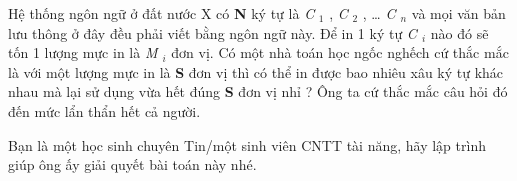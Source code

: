Hệ thống ngôn ngữ ở đất nước X có   \textbf{    N   }   ký tự là   \emph{    C   }$_    1   $   ,   \emph{    C   }$_    2   $   , …   \emph{    C    $_     n    $}   và mọi văn bản lưu thông ở đây đều phải viết bằng ngôn ngữ này. Để in 1 ký tự   \emph{    C    $_     i    $}   nào đó sẽ tốn 1 lượng mực in là   \emph{    M    $_     i    $}   đơn vị. Có một nhà toán học ngốc nghếch cứ thắc mắc là với một lượng mực in là   \textbf{    S   }   đơn vị thì có thể in được bao nhiêu xâu ký tự khác nhau mà lại sử dụng vừa hết đúng   \textbf{    S   }   đơn vị nhỉ ? Ông ta cứ thắc mắc câu hỏi đó đến mức lẩn thẩn hết cả người.  

   Bạn là một học sinh chuyên Tin/một sinh viên CNTT tài năng, hãy lập trình giúp ông ấy giải quyết bài toán này nhé.  

\